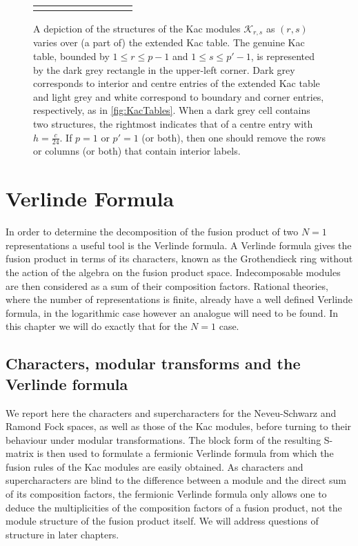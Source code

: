 \documentclass[a4paper,reqno,12pt]{report}
\theoremstyle{definition}
\numberwithin{equation}{section}
\newcommand{\Kac}[1]{\mathcal{K}_{#1}}       %
\newcommand{\ns}{Neveu-Schwarz}
\newcommand{\ram}{Ramond}
\renewcommand{\le}{\leqslant}
\theoremstyle{plain}
\begin{document}
\begin{figure}
{\begin{tabular}{|D{3.5cm}|D{0.5cm}|D{5.5cm}|D{0.5cm}|D{5.5cm}|D{0.5cm}|D{5.5cm}|D{0.5cm}|D{5.5cm}}
\end{tabular}
}
%
\caption{A depiction of the structures of the Kac modules $\Kac{r,s}$ as $(r,s)$ varies over (a part of) the extended Kac table.  The genuine Kac table, bounded by $1 \le r \le p-1$ and $1 \le s \le p'-1$, is represented by the dark grey rectangle in the upper-left corner.  Dark grey corresponds to interior and centre entries of the extended Kac table and light grey and white correspond to boundary and corner entries, respectively, as in \cref{fig:KacTables}.  When a dark grey cell contains two structures, the rightmost indicates that of a centre entry with $h = \frac{c}{24}$.  If $p=1$ or $p'=1$ (or both), then one should remove the rows or columns (or both) that contain interior labels.} \label{fig:KacStructures}
\end{figure}

\chapter{Verlinde Formula}

In order to determine the decomposition of the fusion product of two $N=1$ representations a useful tool is the Verlinde formula. A Verlinde formula gives the fusion product in terms of its characters, known as the Grothendieck ring without the action of the algebra on the fusion product space. Indecomposable modules are then considered as a sum of their composition factors. Rational theories, where the number of representations is finite, already have a well defined Verlinde formula, in the logarithmic case however an analogue will need to be found. In this chapter we will do exactly that for the $N=1$ case.

\section{Characters, modular transforms and the Verlinde formula} \label{sec:CharMod}

We report here the characters and supercharacters for the \ns{} and \ram{} Fock spaces, as well as those of the Kac modules, before turning to their behaviour under modular transformations.  The block form of the resulting S-matrix is then used to formulate a fermionic Verlinde formula from which the fusion rules of the Kac modules are easily obtained.  As characters and supercharacters are blind to the difference between a module and the direct sum of its composition factors, the fermionic Verlinde formula only allows one to deduce the multiplicities of the composition factors of a fusion product, not the module structure of the fusion product itself.  We will address questions of structure in later chapters.
\end{document}
